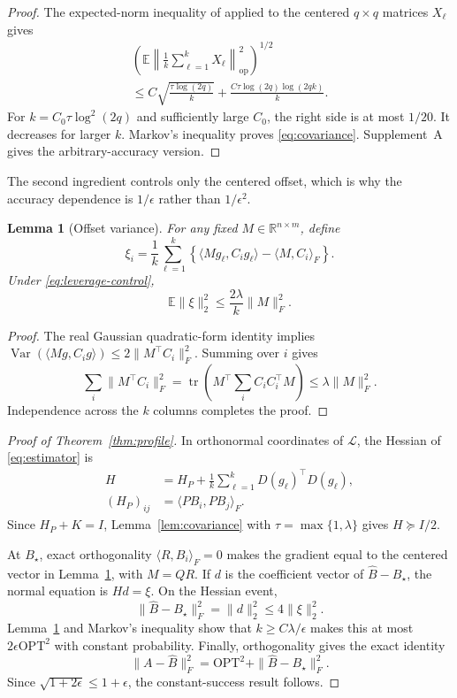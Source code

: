 \documentclass[twoside]{article}
\newtheorem{lemma}[theorem]{Lemma}
\newcommand{\E}{\mathbb E}
\newcommand{\R}{\mathbb R}
\newcommand{\Var}{\operatorname{Var}}
\newcommand{\tr}{\operatorname{tr}}
\newcommand{\op}{\mathrm{op}}
\newcommand{\cL}{\mathcal L}
\newcommand{\OPT}{\mathrm{OPT}}
\begin{document}
\begin{proof}
The expected-norm inequality of \citet{tropp2015expected} applied to the centered $q\times q$ matrices $X_\ell$ gives
\begin{multline}
 \left(\E\left\|\frac1k\sum_{\ell=1}^kX_\ell\right\|_\op^2
 \right)^{1/2}\\
 \le C\sqrt{\frac{\tau\log(2q)}{k}}
 +\frac{C\tau\log(2q)\log(2qk)}{k}.
 \label{eq:tropp-bound}
\end{multline}
For $k=C_0\tau\log^2(2q)$ and sufficiently large $C_0$, the right side is at most $1/20$. It decreases for larger $k$. Markov's inequality proves \eqref{eq:covariance}. Supplement~A gives the arbitrary-accuracy version.
\end{proof}

The second ingredient controls only the centered offset, which is why the accuracy dependence is $1/\epsilon$ rather than $1/\epsilon^2$.

\begin{lemma}[Offset variance]
\label{lem:offset}
For any fixed $M\in\R^{n\times m}$, define \[ \xi_i=\frac1k\sum_{\ell=1}^k \left\{\langle Mg_\ell,C_ig_\ell\rangle -\langle M,C_i\rangle_F\right\}. \] Under \eqref{eq:leverage-control},
\begin{equation}
 \E\|\xi\|_2^2\le\frac{2\lambda}{k}\|M\|_F^2.
 \label{eq:offset}
\end{equation}
\end{lemma}

\begin{proof}
The real Gaussian quadratic-form identity implies $\Var(\langle Mg,C_ig\rangle)\le2\|M^\top C_i\|_F^2$. Summing over $i$ gives \[ \sum_i\|M^\top C_i\|_F^2 =\tr\!\left(M^\top\sum_iC_iC_i^\top M\right) \le\lambda\|M\|_F^2. \] Independence across the $k$ columns completes the proof.
\end{proof}

\begin{proof}[Proof of Theorem~\ref{thm:profile}]
In orthonormal coordinates of $\cL$, the Hessian of \eqref{eq:estimator} is
\begin{align*}
 H&=H_P+\frac1k\sum_{\ell=1}^kD(g_\ell)^\top D(g_\ell),\\
 (H_P)_{ij}&=\langle PB_i,PB_j\rangle_F.
\end{align*}
Since $H_P+K=I$, Lemma~\ref{lem:covariance} with $\tau=\max\{1,\lambda\}$ gives $H\succeq I/2$.

At $B_\star$, exact orthogonality $\langle R,B_i\rangle_F=0$ makes the gradient equal to the centered vector in Lemma~\ref{lem:offset}, with $M=QR$. If $d$ is the coefficient vector of $\widehat B-B_\star$, the normal equation is $Hd=\xi$. On the Hessian event, \[ \|\widehat B-B_\star\|_F^2=\|d\|_2^2\le4\|\xi\|_2^2. \] Lemma~\ref{lem:offset} and Markov's inequality show that $k\ge C\lambda/\epsilon$ makes this at most $2\epsilon\OPT^2$ with constant probability. Finally, orthogonality gives the exact identity
\begin{equation}
 \|A-\widehat B\|_F^2
 =\OPT^2+\|\widehat B-B_\star\|_F^2.
 \label{eq:pythagoras}
\end{equation}
Since $\sqrt{1+2\epsilon}\le1+\epsilon$, the constant-success result follows.

\end{proof}
\end{document}
